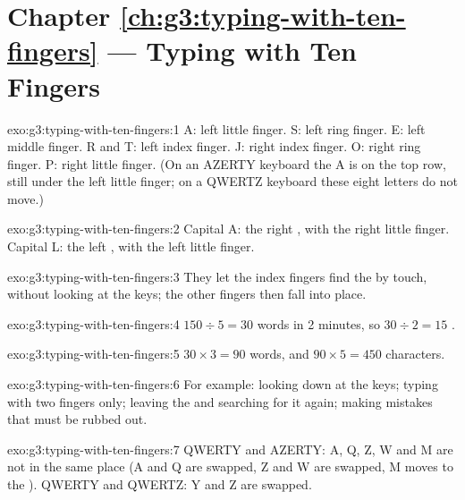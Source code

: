 \section*{Chapter \ref{ch:g3:typing-with-ten-fingers} --- Typing with Ten Fingers}

\begin{solution}{exo:g3:typing-with-ten-fingers:1}
A: left little finger. S: left ring finger. E: left middle finger. R and T:
left index finger. J: right index finger. O: right ring finger. P: right little
finger. (On an AZERTY keyboard the A is on the top row, still under the left
little finger; on a QWERTZ keyboard these eight letters do not move.)
\end{solution}

\begin{solution}{exo:g3:typing-with-ten-fingers:2}
Capital A: the right , with the right little finger. Capital L: the
left , with the left little finger.
\end{solution}

\begin{solution}{exo:g3:typing-with-ten-fingers:3}
They let the index fingers find the  by touch, without looking at the
keys; the other fingers then fall into place.
\end{solution}

\begin{solution}{exo:g3:typing-with-ten-fingers:4}
$150 \div 5 = 30$ words in 2 minutes, so $30 \div 2 = 15$ .
\end{solution}

\begin{solution}{exo:g3:typing-with-ten-fingers:5}
$30 \times 3 = 90$ words, and $90 \times 5 = 450$ characters.
\end{solution}

\begin{solution}{exo:g3:typing-with-ten-fingers:6}
For example: looking down at the keys; typing with two fingers only; leaving
the  and searching for it again; making mistakes that must be rubbed
out.
\end{solution}

\begin{solution}{exo:g3:typing-with-ten-fingers:7}
QWERTY and AZERTY: A, Q, Z, W and M are not in the same place (A and Q are
swapped, Z and W are swapped, M moves to the ). QWERTY and QWERTZ: Y
and Z are swapped.
\end{solution}

